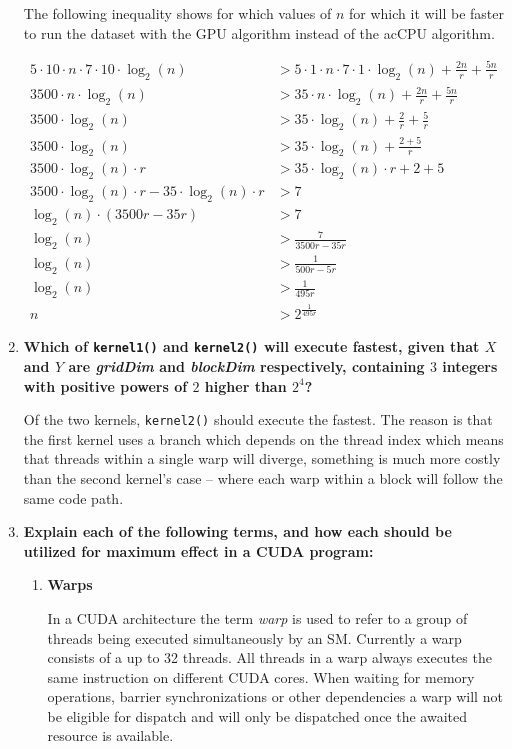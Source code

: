 \begin{enumerate}
The following inequality shows for which values of $n$ for which it will be faster to run the dataset with the \ac{GPU} algorithm instead of the ac{CPU} algorithm.

\begin{align*}
5 \cdot 10 \cdot n \cdot 7 \cdot 10 \cdot \log_2(n) &> 5 \cdot 1 \cdot n \cdot 7 \cdot 1 \cdot \log_2(n) + \frac{2n}{r} + \frac{5n}{r}\\
3500 \cdot n \cdot \log_2(n) &> 35 \cdot n \cdot \log_2(n) + \frac{2n}{r} + \frac{5n}{r}\\
3500 \cdot \log_2(n) &> 35 \cdot \log_2(n) + \frac{2}{r} + \frac{5}{r}\\
3500 \cdot \log_2(n) &> 35 \cdot \log_2(n) + \frac{2 + 5}{r}\\
3500 \cdot \log_2(n) \cdot r &> 35 \cdot \log_2(n) \cdot r + 2 + 5\\
3500 \cdot \log_2(n) \cdot r - 35 \cdot \log_2(n) \cdot r &> 7\\
\log_2(n) \cdot (3500r - 35r) &> 7\\
\log_2(n) &> \frac{7}{3500r - 35r}\\
\log_2(n) &> \frac{1}{500r - 5r}\\
\log_2(n) &> \frac{1}{495r}\\
n &> 2^{\frac{1}{495r}}
\end{align*}

\item \textbf{Which of \texttt{kernel1()} and \texttt{kernel2()} will execute fastest, given that $X$ and $Y$ are \textit{gridDim} and \textit{blockDim} respectively, containing $3$ integers with positive powers of $2$ higher than $2^4$?}

Of the two kernels, \texttt{kernel2()} should execute the fastest. The reason is that the first kernel uses a branch which depends on the thread index which means that threads within a single warp will diverge, something is much more costly than the second kernel's case -- where each warp within a block will follow the same code path.

\item \textbf{Explain each of the following terms, and how each should be utilized for maximum effect in a CUDA program:}

\begin{enumerate}

\item \textbf{Warps}

In a \ac{CUDA} architecture the term \textit{warp} is used to refer to a group of threads being executed simultaneously by an \ac{SM}. Currently a warp consists of a up to 32 threads. All threads in a warp always executes the same instruction on different \ac{CUDA} cores. When waiting for memory operations, barrier synchronizations or other dependencies a warp will not be eligible for dispatch and will only be dispatched once the awaited resource is available. 


\end{enumerate}
\end{enumerate}
